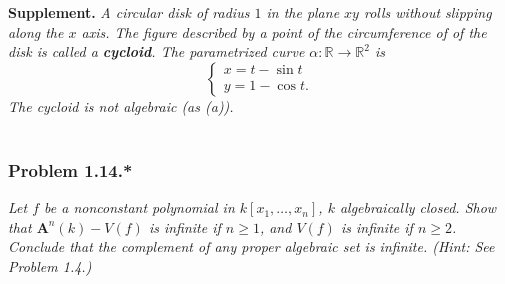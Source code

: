 \documentclass{article}
\begin{document}
\textbf{Supplement.}
\emph{A circular disk of radius $1$ in the plane $xy$ rolls without slipping
along the $x$ axis.
The figure described by a point of the circumference of of the disk is
called a \textbf{cycloid}.
The parametrized curve $\alpha: \mathbb{R} \to \mathbb{R}^2$
is
\begin{equation*}
  \begin{cases}
     x = t - \sin t \\
     y = 1 - \cos t.
  \end{cases}
\end{equation*}
The cycloid is not algebraic (as (a)).} \\\\






\subsubsection*{Problem 1.14.*}
\emph{Let $f$ be a nonconstant polynomial in $k[x_1, \ldots, x_n]$,
$k$ algebraically closed.
Show that $\mathbf{A}^{n}(k) - V(f)$ is infinite if $n \geq 1$,
and $V(f)$ is infinite if $n \geq 2$.
Conclude that the complement of any proper algebraic set is infinite.
(Hint: See Problem 1.4.)} \\
\end{document}
